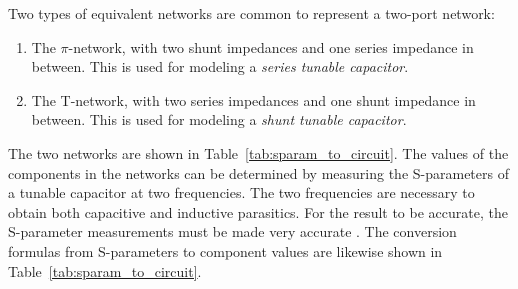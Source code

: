 Two types of equivalent networks are common to represent a two-port network:
\begin{enumerate}
\item The $\pi$-network, with two shunt impedances and one series impedance in between. This is used for modeling a \emph{series tunable capacitor}.
\item The T-network, with two series impedances and one shunt impedance in between. This is used for modeling a \emph{shunt tunable capacitor}.
\end{enumerate}
The two networks are shown in Table~\ref{tab:sparam_to_circuit}. The values of the components in the networks can be determined by measuring the S-parameters of a tunable capacitor at two frequencies. The two frequencies are necessary to obtain both capacitive and inductive parasitics. For the result to be accurate, the S-parameter measurements must be made very accurate \cite{gu2014rf}. The conversion formulas from S-parameters to component values are likewise shown in Table~\ref{tab:sparam_to_circuit}.

